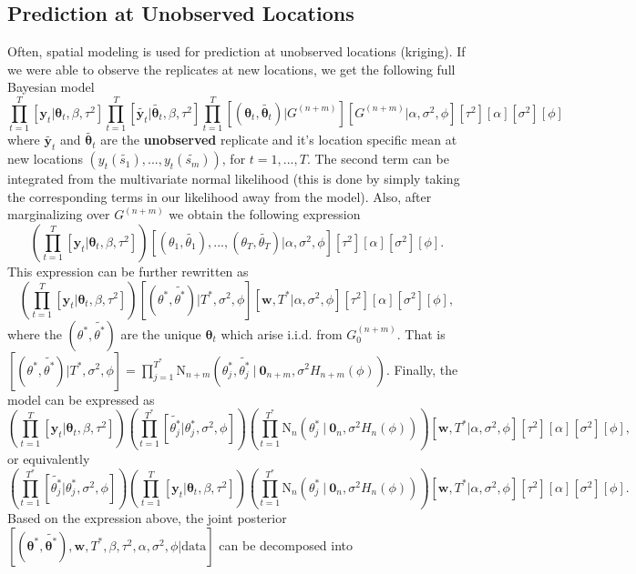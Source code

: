 \documentclass[11pt]{article}
\newcommand{\m}[1]{\mathbf{\bm{#1}}} %
\begin{document}
\subsection{Prediction at Unobserved Locations}
Often, spatial modeling is used for prediction at unobserved locations
(kriging). If we were able to observe the replicates at new locations, we
get the following full Bayesian model
\[
  \prod_{t=1}^{T} [\m y_t|\m\theta_t,\beta,\tau^2]
  \prod_{t=1}^{T} [\tilde{\m y_t}|\tilde{\m\theta_t},\beta,\tau^2]
  \prod_{t=1}^{T} [(\m\theta_t,\tilde{\m\theta_t})|G^{(n+m)}][G^{(n+m)}|\alpha,\sigma^2,\phi]
  [\tau^2][\alpha][\sigma^2][\phi]
\]
where $\tilde{\m y_t}$ and $\tilde{\m\theta_t}$ are the \textbf{unobserved}
replicate and it's location specific mean at new locations
$(y_t(\tilde{s_1}),...,y_t(\tilde{s_m}))$, for $t=1,...,T$. The second term can
be integrated from the multivariate normal likelihood (this is done by simply
taking the corresponding terms in our likelihood away from the model). Also, 
after marginalizing over $G^{(n+m)}$ we obtain the following expression
\[
  \left(\prod_{t=1}^{T} [\m y_t|\m\theta_t,\beta,\tau^2]\right)
  [(\theta_1,\tilde{\theta_1}),...,(\theta_T,\tilde{\theta_T})|\alpha,\sigma^2,\phi]
  [\tau^2][\alpha][\sigma^2][\phi].
\]
This expression can be further rewritten as 
\[
  \left(\prod_{t=1}^{T} [\m y_t|\m\theta_t,\beta,\tau^2]\right)
  [(\theta^*,\tilde{\theta^*})|T^*,\sigma^2,\phi][\m w, T^*|\alpha,\sigma^2,\phi]
  [\tau^2][\alpha][\sigma^2][\phi],
\]
where the $(\theta^*,\tilde{\theta^*})$ are the unique $\m\theta_t$ which arise
i.i.d. from $G_0^{(n+m)}$. That is
$[(\theta^*,\tilde{\theta^*})|T^*,\sigma^2,\phi]
=\prod_{j=1}^{T^*}\text{N}_{n+m}(\theta^*_j,\tilde{\theta^*_j}~|~\m
0_{n+m},\sigma^2 H_{n+m}(\phi))$. Finally, the model can be expressed as
\[
  \left(\prod_{t=1}^{T} [\m y_t|\m\theta_t,\beta,\tau^2]\right)
  \left(\prod_{t=1}^{T^*}[\tilde{\theta_j^*}| \theta_j^*,\sigma^2,\phi]\right)
  \left(\prod_{t=1}^{T^*}\text{N}_{n}(\theta^*_j~|~\m 0_{n},\sigma^2 H_n(\phi))\right)
  [\m w, T^*|\alpha,\sigma^2,\phi] [\tau^2][\alpha][\sigma^2][\phi],
\] or equivalently
\[
  \left(\prod_{t=1}^{T^*}[\tilde{\theta_j^*}| \theta_j^*,\sigma^2,\phi]\right)
  \left(\prod_{t=1}^{T} [\m y_t|\m\theta_t,\beta,\tau^2]\right)
  \left(\prod_{t=1}^{T^*}\text{N}_{n}(\theta^*_j~|~\m 0_{n},\sigma^2 H_n(\phi))\right)
  [\m w, T^*|\alpha,\sigma^2,\phi] [\tau^2][\alpha][\sigma^2][\phi].
\]
Based on the expression above, the joint posterior
$[(\m\theta^*,\tilde{\m\theta^*}),\m w, T^*,\beta,\tau^2,\alpha,\sigma^2,\phi|\text{data}]$
can be decomposed into 
\end{document}
